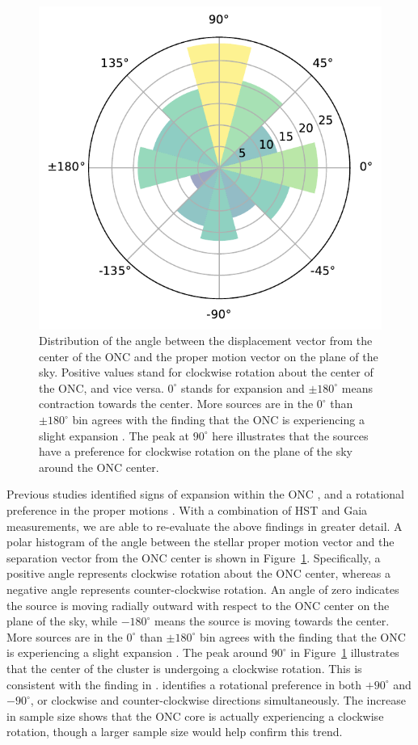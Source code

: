 \documentclass[12pt]{ucsddissertation}
\begin{document}
\begin{CJK*}{UTF8}{gbsn}
\begin{figure}[htb!]
    \centering
    \includegraphics[width=0.7\linewidth]{figures/chapter1/pm_direction.pdf}
    \caption[Distribution of proper motion directions]{Distribution of the angle between the displacement vector from the center of the ONC and the proper motion vector on the plane of the sky. Positive values stand for clockwise rotation about the center of the ONC, and vice versa. $0^\circ$ stands for expansion and $\pm180^\circ$ means contraction towards the center. More sources are in the $0^\circ$ than $\pm180^\circ$ bin agrees with the finding that the ONC is experiencing a slight expansion \citep[][]{Kounkel-2022}. The peak at $90^\circ$ here illustrates that the sources have a preference for clockwise rotation on the plane of the sky around the ONC center.}
    \label{fig:pm direction}
\end{figure}

Previous studies identified signs of expansion within the ONC \citep[e.g.,][]{Kounkel-2022}, and a rotational preference in the proper motions . With a combination of HST and Gaia measurements, we are able to re-evaluate the above findings in greater detail. A polar histogram of the angle between the stellar proper motion vector and the separation vector from the ONC center is shown in Figure~\ref{fig:pm direction}. Specifically, a positive angle represents clockwise rotation about the ONC center, whereas a negative angle represents counter-clockwise rotation. An angle of zero indicates the source is moving radially outward with respect to the ONC center on the plane of the sky, while $-180^\circ$ means the source is moving towards the center. More sources are in the $0^\circ$ than $\pm180^\circ$ bin agrees with the finding that the ONC is experiencing a slight expansion \citep[][]{Kounkel-2022}. The peak around $90^\circ$ in Figure~\ref{fig:pm direction} illustrates that the center of the cluster is undergoing a clockwise rotation. This is consistent with the finding in \citet{Strand-1958}.  identifies a rotational preference in both $+90^\circ$ and $-90^\circ$, or clockwise and counter-clockwise directions simultaneously. The increase in sample size shows that the ONC core is actually experiencing a clockwise rotation, though a larger sample size would help confirm this trend.



\end{CJK*}
\end{document}
